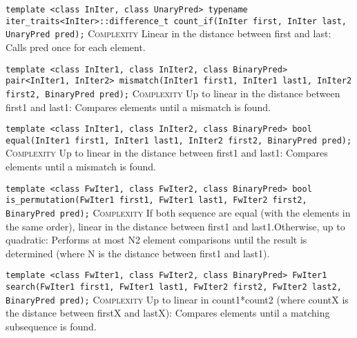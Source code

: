 \noindent{}\hspace*{0.25em}\lstinline[basicstyle=\ttfamily\color{corange}]{template <class InIter, class UnaryPred> typename iter_traits<InIter>::difference_t count_if(InIter first, InIter last, UnaryPred pred);} \textsc{Complexity} Linear in the distance between first and last: Calls pred once for each element.\\\vspace{-0.6em}

\noindent{}\hspace*{0.25em}\lstinline[basicstyle=\ttfamily\color{corange}]{template <class InIter1, class InIter2, class BinaryPred> pair<InIter1, InIter2> mismatch(InIter1 first1, InIter1 last1, InIter2 first2, BinaryPred pred);} \textsc{Complexity} Up to linear in the distance between first1 and last1: Compares elements until a mismatch is found.\\\vspace{-0.6em}

\noindent{}\hspace*{0.25em}\lstinline[basicstyle=\ttfamily\color{corange}]{template <class InIter1, class InIter2, class BinaryPred> bool equal(InIter1 first1, InIter1 last1, InIter2 first2, BinaryPred pred);} \textsc{Complexity} Up to linear in the distance between first1 and last1: Compares elements until a mismatch is found.\\\vspace{-0.6em}

\noindent{}\hspace*{0.25em}\lstinline[basicstyle=\ttfamily\color{corange}]{template <class FwIter1, class FwIter2, class BinaryPred> bool is_permutation(FwIter1 first1, FwIter1 last1, FwIter2 first2, BinaryPred pred);} \textsc{Complexity} If both sequence are equal (with the elements in the same order), linear in the distance between first1 and last1.Otherwise, up to quadratic: Performs at most N2 element comparisons until the result is determined (where N is the distance between first1 and last1).\\\vspace{-0.6em}

\noindent{}\hspace*{0.25em}\lstinline[basicstyle=\ttfamily\color{corange}]{template <class FwIter1, class FwIter2, class BinaryPred> FwIter1 search(FwIter1 first1, FwIter1 last1, FwIter2 first2, FwIter2 last2, BinaryPred pred);} \textsc{Complexity} Up to linear in count1*count2 (where countX is the distance between firstX and lastX): Compares elements until a matching subsequence is found.\\\vspace{-0.6em}

